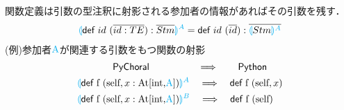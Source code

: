 \documentclass{thesis}
\newcommand{\projection}[2]{{\color{cyan}\llparenthesis}#1{\color{cyan}\rrparenthesis^#2}}
\newcommand{\cyan}[1]{\color{cyan}#1}
\begin{document}
関数定義は引数の型注釈に射影される参加者の情報があればその引数を残す．
\begin{alignat*}{2} 
  &\projection{\textsf{def} ~id~(\overline{id:TE}):\overline{Stm}}{A} = \textsf{def} ~id~ (\overline{id}):\overline{\projection{Stm}{A}}\\
\end{alignat*}
(例)参加者$\cyan{\text{A}}$が関連する引数をもつ関数の射影
\begin{alignat*}{2} 
  &~~~~~~~~~~~\textsf{PyChoral} ~~~~~~~~~~~~~~~\Longrightarrow~~~~~~ \textsf{Python}\\
  &\projection{\textsf{def} ~\text{f}~(\text{self},x:\text{At[int,{\cyan{A}}]})}{A} ~~~\Longrightarrow~~~ \textsf{def} ~\text{f}~ (\text{self},x)\\
  &\projection{\textsf{def} ~\text{f}~(\text{self},x:\text{At[int,{\cyan{A}}]})}{B} ~~~\Longrightarrow~~~ \textsf{def} ~\text{f}~ (\text{self})\\
\end{alignat*}
\end{document}
